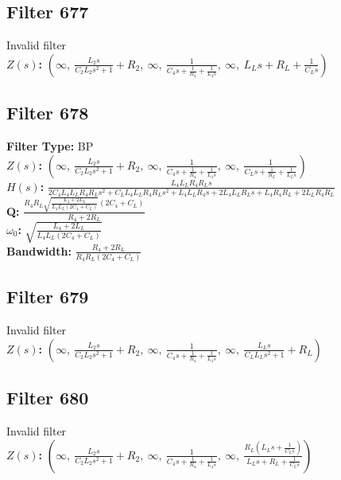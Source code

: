 \documentclass{article}
\begin{document}
\subsection*{Filter 677}
Invalid filter \\ 
\textbf{$Z(s)$:} $\left( \infty, \  \frac{L_{2} s}{C_{2} L_{2} s^{2} + 1} + R_{2}, \  \infty, \  \frac{1}{C_{4} s + \frac{1}{R_{4}} + \frac{1}{L_{4} s}}, \  \infty, \  L_{L} s + R_{L} + \frac{1}{C_{L} s}\right)$ \\ 
\subsection*{Filter 678}
\textbf{Filter Type:} BP \\ 
\textbf{$Z(s)$:} $\left( \infty, \  \frac{L_{2} s}{C_{2} L_{2} s^{2} + 1} + R_{2}, \  \infty, \  \frac{1}{C_{4} s + \frac{1}{R_{4}} + \frac{1}{L_{4} s}}, \  \infty, \  \frac{1}{C_{L} s + \frac{1}{R_{L}} + \frac{1}{L_{L} s}}\right)$ \\ 
\textbf{$H(s)$:} $\frac{L_{4} L_{L} R_{4} R_{L} s}{2 C_{4} L_{4} L_{L} R_{4} R_{L} s^{2} + C_{L} L_{4} L_{L} R_{4} R_{L} s^{2} + L_{4} L_{L} R_{4} s + 2 L_{4} L_{L} R_{L} s + L_{4} R_{4} R_{L} + 2 L_{L} R_{4} R_{L}}$ \\ 
\textbf{Q:} $\frac{R_{4} R_{L} \sqrt{\frac{L_{4} + 2 L_{L}}{L_{4} L_{L} \left(2 C_{4} + C_{L}\right)}} \left(2 C_{4} + C_{L}\right)}{R_{4} + 2 R_{L}}$ \\ 
\textbf{$\omega_0$:} $\sqrt{\frac{L_{4} + 2 L_{L}}{L_{4} L_{L} \left(2 C_{4} + C_{L}\right)}}$ \\ 
\textbf{Bandwidth:} $\frac{R_{4} + 2 R_{L}}{R_{4} R_{L} \left(2 C_{4} + C_{L}\right)}$ \\ 
\subsection*{Filter 679}
Invalid filter \\ 
\textbf{$Z(s)$:} $\left( \infty, \  \frac{L_{2} s}{C_{2} L_{2} s^{2} + 1} + R_{2}, \  \infty, \  \frac{1}{C_{4} s + \frac{1}{R_{4}} + \frac{1}{L_{4} s}}, \  \infty, \  \frac{L_{L} s}{C_{L} L_{L} s^{2} + 1} + R_{L}\right)$ \\ 
\subsection*{Filter 680}
Invalid filter \\ 
\textbf{$Z(s)$:} $\left( \infty, \  \frac{L_{2} s}{C_{2} L_{2} s^{2} + 1} + R_{2}, \  \infty, \  \frac{1}{C_{4} s + \frac{1}{R_{4}} + \frac{1}{L_{4} s}}, \  \infty, \  \frac{R_{L} \left(L_{L} s + \frac{1}{C_{L} s}\right)}{L_{L} s + R_{L} + \frac{1}{C_{L} s}}\right)$ \\ 
\end{document}
